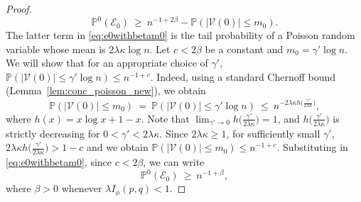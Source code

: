 \documentclass[10pt,a4paper]{amsart}
\def\P{\mathbb{P}}
\def\cE{\mathcal{E}}
\def\cV{\mathcal{V}}
\newcommand{\ga}{\gamma}
\newcommand{\ka}{\kappa}
\newcommand{\la}{\lambda}
\def\weq{ \ = \ }
\def\wge{ \ \ge \ }
\def\wle{ \ \le \ }
\begin{document}
\begin{proof}
\begin{equation}
\P^0(\cE_0 )
\wge n^{-1+2\beta} -\P(|\cV(0)| \le m_0).
\label{eq:e0withbetam0}
\end{equation}
The latter term in \eqref{eq:e0withbetam0} is the tail probability of a Poisson random variable whose mean is $2\la \ka \log n$. Let $c<2\beta$ be a constant and $m_0 = \ga' \log n$. We will show that for an appropriate choice of $\ga'$, $\P(|\cV(0)| \le \ga' \log n) \le n^{-1+c}$. Indeed,
using a standard Chernoff bound (Lemma~\ref{lem:conc_poisson_new}), we obtain
\[
\P(|\cV(0)| \le m_0) 
\weq \P(|\cV(0)| \le \ga' \log n)
\wle n^{-2 \la \ka h\big(\frac{\ga'}{2 \la \ka}\big)},
\]
where
$h(x) = x \log x + 1 - x$.
Note that $\lim_{\ga'\to 0}h\big(\frac{\ga'}{2 \la \ka}\big) = 1$, and $h\big(\frac{\ga'}{2 \la \ka}\big)$ is strictly decreasing for $0<\ga'<2\la \ka$. Since $2\la \ka \ge 1$, for sufficiently small $\ga'$, $2 \la \ka h\big(\frac{\ga'}{2 \la \ka}\big) >1-c$ and we obtain $\P(|\cV(0)| \le m_0) \le n^{-1+c}$. Substituting in \eqref{eq:e0withbetam0}, since $c<2\beta$, we can write
\[
\P^0(\cE_0 )
\wge n^{-1+\beta},
\]
where $\beta>0$ whenever $\la I_{\phi}(p,q)<1$.
\end{proof}
\end{document}
